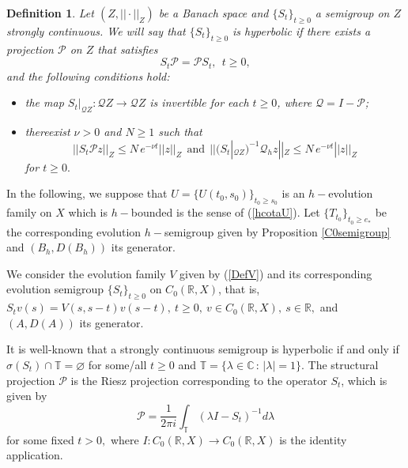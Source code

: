 \documentclass[10pt]{amsart}
\newtheorem{definition}{Definition}
\numberwithin{equation}{section}
\begin{document}
\begin{definition}
\label{Def10}
 Let $(Z,||\cdot||_{Z})$ be a Banach space and $\{S_{t}\}_{t \ge 0}$ a semigroup on $Z$ strongly continuous. We will say that $\{S_{t}\}_{t \ge 0}$ is hyperbolic if there exists a projection $\mathcal{P}$ on $Z$ that satisfies 
 \begin{equation}
 \label{commut}
 S_t \mathcal{P} = \mathcal{P} S_{t}, \ \ t \ge 0, 
 \end{equation}
 and the following conditions hold:
\begin{itemize}
    \item the map $S_{t}|_{\mathcal{Q}Z}: \mathcal{Q} Z \to \mathcal{Q}Z$ is invertible for each $t \ge 0$, where $\mathcal{Q} = I - \mathcal{P}$;

    \item thereexist $\nu > 0$ and $N \ge 1$ such that 
    $$
    ||S_{t} \mathcal{P}z||_Z \le N \, e^{-\nu t} ||z||_{Z} \ \ \mbox{and} \ \ ||(S_{t}|_{\mathcal{Q}Z})^{-1}  \mathcal{Q}_hz||_Z\le N \, e^{-\nu t} ||z||_{Z}    $$
    \noindent for $t \ge 0.$
\end{itemize}



\end{definition}

\medskip

In the following, we suppose that $U = \{U(t_0, s_0)\}_{t_0 \ge s_0}$ is an $h-$evolution family on $X$ which is $h-$bounded is the sense of (\ref{hcotaU}). Let   $\{T_{t_0} \}_{t_0 \ge e_*}$ be the corresponding evolution $h-$semigroup given by Proposition \ref{C0semigroup} and $(B_h, D(B_h))$ its generator. 

\medskip

We consider the evolution family $V$ given by (\ref{DefV}) and its corresponding evolution semigroup $\{S_t\}_{t \ge 0}$ on $C_0(\mathbb{R}, X)$, that is, 
$S_tv(s) = V(s,s-t) v(s-t), \ t \ge 0, \ v \in  C_0(\mathbb{R}, X), \ s \in \mathbb{R},$ and $(A,D(A))$ its generator.


\medskip

It is well-known that a strongly continuous semigroup is hyperbolic if and only if  $\sigma(S_t) \cap \mathbb{T} = \varnothing$ for some/all $t \ge 0$ and $\mathbb{T} = \{\lambda  \in \mathbb{C} \, : \, |\lambda| = 1\}.$ The structural projection $\mathcal{P}$ is the Riesz projection corresponding to the  operator $S_t$, which is given by 
$$
\mathcal{P} = \frac{1}{2\pi i} \int_{\mathbb{T}} (\lambda I - S_t)^{-1} d\lambda 
$$
for some fixed $t > 0,$ where $I: C_0(\mathbb{R},X) \to C_0(\mathbb{R},X)$ is 
the identity application.
\end{document}
